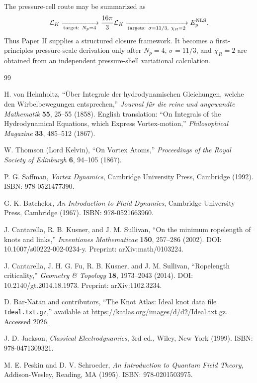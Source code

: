 \documentclass[11pt]{article}
\begin{document}
The pressure-cell route may be summarized as
\[
  \mathcal L_K
  \xrightarrow[\text{target: }N_p=4]{}
  \frac{16\pi}{3}\mathcal L_K
  \xrightarrow[\text{targets: }\sigma=11/3,\ \chi_R=2]{}
  E_p^{\rm NLS}.
\]
Thus Paper II supplies a structured closure framework.  It becomes a
first-principles pressure-scale derivation only after \(N_p=4\),
\(\sigma=11/3\), and \(\chi_R=2\) are obtained from an independent
pressure-shell variational calculation.


\begin{thebibliography}{99}

H. von Helmholtz, ``Über Integrale der hydrodynamischen Gleichungen, welche den Wirbelbewegungen entsprechen,''
\emph{Journal für die reine und angewandte Mathematik} \textbf{55}, 25--55 (1858).
English translation: ``On Integrals of the Hydrodynamical Equations, which Express Vortex-motion,''
\emph{Philosophical Magazine} \textbf{33}, 485--512 (1867).

W. Thomson (Lord Kelvin), ``On Vortex Atoms,''
\emph{Proceedings of the Royal Society of Edinburgh} \textbf{6}, 94--105 (1867).

P. G. Saffman, \emph{Vortex Dynamics}, Cambridge University Press, Cambridge (1992).
ISBN: 978-0521477390.

G. K. Batchelor, \emph{An Introduction to Fluid Dynamics}, Cambridge University Press, Cambridge (1967).
ISBN: 978-0521663960.

J. Cantarella, R. B. Kusner, and J. M. Sullivan,
``On the minimum ropelength of knots and links,''
\emph{Inventiones Mathematicae} \textbf{150}, 257--286 (2002).
DOI: 10.1007/s00222-002-0234-y.
Preprint: arXiv:math/0103224.

J. Cantarella, J. H. G. Fu, R. B. Kusner, and J. M. Sullivan,
``Ropelength criticality,''
\emph{Geometry \& Topology} \textbf{18}, 1973--2043 (2014).
DOI: 10.2140/gt.2014.18.1973.
Preprint: arXiv:1102.3234.

D. Bar-Natan and contributors,
``The Knot Atlas: Ideal knot data file \texttt{Ideal.txt.gz},''
available at \url{https://katlas.org/images/d/d2/Ideal.txt.gz}.
Accessed 2026.

J. D. Jackson, \emph{Classical Electrodynamics}, 3rd ed.,
Wiley, New York (1999). ISBN: 978-0471309321.

M. E. Peskin and D. V. Schroeder,
\emph{An Introduction to Quantum Field Theory},
Addison-Wesley, Reading, MA (1995). ISBN: 978-0201503975.


\end{thebibliography}
\end{document}
